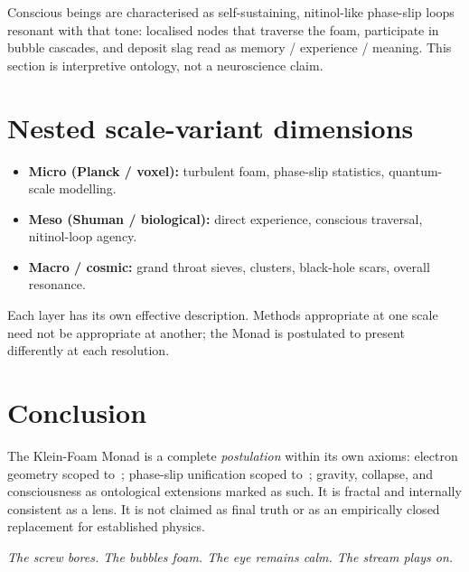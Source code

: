 \documentclass[11pt,a4paper]{article}
\theoremstyle{definition}
\theoremstyle{remark}
\begin{document}
Conscious beings are characterised as self-sustaining, nitinol-like
phase-slip loops resonant with that tone: localised nodes that traverse
the foam, participate in bubble cascades, and deposit slag read as
memory / experience / meaning.  This section is interpretive ontology,
not a neuroscience claim.

\section{Nested scale-variant dimensions}
\label{sec:scales}

\begin{itemize}[leftmargin=1.3em,itemsep=2pt]
  \item \textbf{Micro (Planck / voxel):} turbulent foam, phase-slip
        statistics, quantum-scale modelling.
  \item \textbf{Meso (Shuman / biological):} direct experience, conscious
        traversal, nitinol-loop agency.
  \item \textbf{Macro / cosmic:} grand throat sieves, clusters, black-hole
        scars, overall resonance.
\end{itemize}
Each layer has its own effective description.  Methods appropriate at one
scale need not be appropriate at another; the Monad is postulated to
present differently at each resolution.

\section{Conclusion}
\label{sec:conclusion}

The Klein-Foam Monad is a complete \emph{postulation} within its own
axioms: electron geometry scoped to~\cite{Mobius2026}; phase-slip
unification scoped to~\cite{FlagDecay2026}; gravity, collapse, and
consciousness as ontological extensions marked as such.  It is fractal
and internally consistent as a lens.  It is not claimed as final truth
or as an empirically closed replacement for established physics.

\vspace{1em}
\noindent\textit{The screw bores. The bubbles foam. The eye remains calm.
The stream plays on.}
\end{document}
